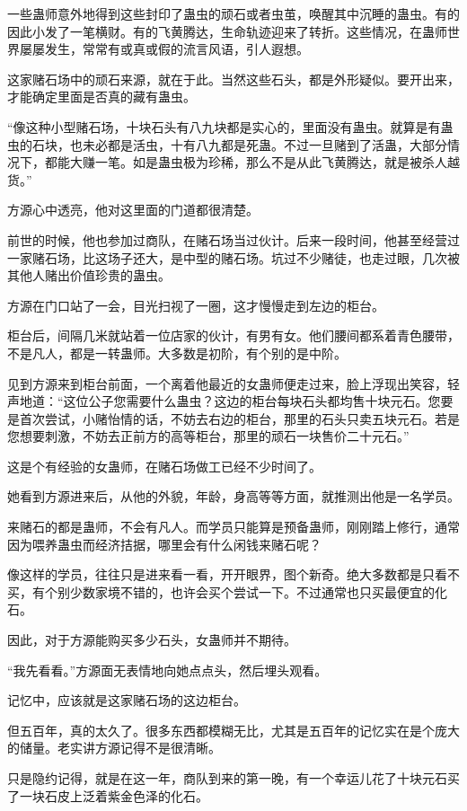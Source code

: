 \begin{this_body}
一些蛊师意外地得到这些封印了蛊虫的顽石或者虫茧，唤醒其中沉睡的蛊虫。有的因此小发了一笔横财。有的飞黄腾达，生命轨迹迎来了转折。这些情况，在蛊师世界屡屡发生，常常有或真或假的流言风语，引人遐想。

这家赌石场中的顽石来源，就在于此。当然这些石头，都是外形疑似。要开出来，才能确定里面是否真的藏有蛊虫。

“像这种小型赌石场，十块石头有八九块都是实心的，里面没有蛊虫。就算是有蛊虫的石块，也未必都是活虫，十有八九都是死蛊。不过一旦赌到了活蛊，大部分情况下，都能大赚一笔。如是蛊虫极为珍稀，那么不是从此飞黄腾达，就是被杀人越货。”

方源心中透亮，他对这里面的门道都很清楚。

前世的时候，他也参加过商队，在赌石场当过伙计。后来一段时间，他甚至经营过一家赌石场，比这场子还大，是中型的赌石场。坑过不少赌徒，也走过眼，几次被其他人赌出价值珍贵的蛊虫。

方源在门口站了一会，目光扫视了一圈，这才慢慢走到左边的柜台。

柜台后，间隔几米就站着一位店家的伙计，有男有女。他们腰间都系着青色腰带，不是凡人，都是一转蛊师。大多数是初阶，有个别的是中阶。

见到方源来到柜台前面，一个离着他最近的女蛊师便走过来，脸上浮现出笑容，轻声地道：“这位公子您需要什么蛊虫？这边的柜台每块石头都均售十块元石。您要是首次尝试，小赌怡情的话，不妨去右边的柜台，那里的石头只卖五块元石。若是您想要刺激，不妨去正前方的高等柜台，那里的顽石一块售价二十元石。”

这是个有经验的女蛊师，在赌石场做工已经不少时间了。

她看到方源进来后，从他的外貌，年龄，身高等等方面，就推测出他是一名学员。

来赌石的都是蛊师，不会有凡人。而学员只能算是预备蛊师，刚刚踏上修行，通常因为喂养蛊虫而经济拮据，哪里会有什么闲钱来赌石呢？

像这样的学员，往往只是进来看一看，开开眼界，图个新奇。绝大多数都是只看不买，有个别少数家境不错的，也许会买个尝试一下。不过通常也只买最便宜的化石。

因此，对于方源能购买多少石头，女蛊师并不期待。

“我先看看。”方源面无表情地向她点点头，然后埋头观看。

记忆中，应该就是这家赌石场的这边柜台。

但五百年，真的太久了。很多东西都模糊无比，尤其是五百年的记忆实在是个庞大的储量。老实讲方源记得不是很清晰。

只是隐约记得，就是在这一年，商队到来的第一晚，有一个幸运儿花了十块元石买了一块石皮上泛着紫金色泽的化石。


\end{this_body}
